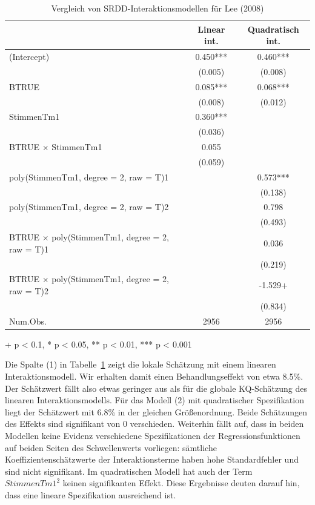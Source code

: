 \documentclass[
  a4paper,
  DIV=11,
  oneside]{scrreprt}
\begin{document}
\hypertarget{tbl-intmodsLee}{}
\setlength{\LTpost}{0mm}
\begin{longtable}{lcc}
\caption{\label{tbl-intmodsLee}Vergleich von SRDD-Interaktionsmodellen für Lee (2008) }\tabularnewline

\toprule
  & Linear int. & Quadratisch int. \\ 
\midrule\addlinespace[2.5pt]
(Intercept) & 0.450*** & 0.460*** \\ 
 & (0.005) & (0.008) \\ 
BTRUE & 0.085*** & 0.068*** \\ 
 & (0.008) & (0.012) \\ 
StimmenTm1 & 0.360*** &  \\ 
 & (0.036) &  \\ 
BTRUE × StimmenTm1 & 0.055 &  \\ 
 & (0.059) &  \\ 
poly(StimmenTm1, degree = 2, raw = T)1 &  & 0.573*** \\ 
 &  & (0.138) \\ 
poly(StimmenTm1, degree = 2, raw = T)2 &  & 0.798 \\ 
 &  & (0.493) \\ 
BTRUE × poly(StimmenTm1, degree = 2, raw = T)1 &  & 0.036 \\ 
 &  & (0.219) \\ 
BTRUE × poly(StimmenTm1, degree = 2, raw = T)2 &  & -1.529+ \\ 
 &  & (0.834) \\ 
Num.Obs. & 2956 & 2956 \\ 
\bottomrule
\end{longtable}
\begin{minipage}{\linewidth}
+ p < 0.1, * p < 0.05, ** p < 0.01, *** p < 0.001\\
\end{minipage}

Die Spalte (1) in Tabelle~\ref{tbl-intmodsLee} zeigt die lokale
Schätzung mit einem linearen Interaktionsmodell. Wir erhalten damit
einen Behandlungseffekt von etwa 8.5\%. Der Schätzwert fällt also etwas
geringer aus als für die globale KQ-Schätzung des linearen
Interaktionsmodells. Für das Modell (2) mit quadratischer Spezifikation
liegt der Schätzwert mit 6.8\% in der gleichen Größenordnung. Beide
Schätzungen des Effekts sind signifikant von 0 verschieden. Weiterhin
fällt auf, dass in beiden Modellen keine Evidenz verschiedene
Spezifikationen der Regressionsfunktionen auf beiden Seiten des
Schwellenwerts vorliegen: sämtliche Koeffizientenschätzwerte der
Interaktionsterme haben hohe Standardfehler und sind nicht signifikant.
Im quadratischen Modell hat auch der Term \(StimmenTm1^2\) keinen
signifikanten Effekt. Diese Ergebnisse deuten darauf hin, dass eine
lineare Spezifikation ausreichend ist.
\end{document}
